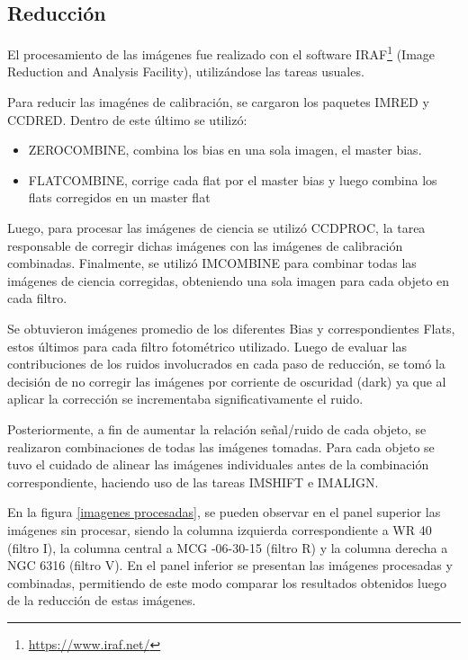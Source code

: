 \documentclass[baaa]{baaa}
\begin{document}
\subsection{Reducción}
El procesamiento de las imágenes fue realizado con el software IRAF\footnote{\url{https://www.iraf.net/}} (Image Reduction and Analysis Facility), utilizándose las tareas usuales.


Para reducir las imagénes de calibración, se cargaron los paquetes IMRED y CCDRED. Dentro de este último se utilizó:

 \begin{itemize}
     \item \textsc{ZEROCOMBINE}, combina los bias en una sola imagen, el master bias.
     \item \textsc{FLATCOMBINE}, corrige cada flat por el master bias y luego combina los flats corregidos en un master flat    
 \end{itemize}

 Luego, para procesar las imágenes de ciencia se utilizó \textsc{CCDPROC}, la tarea responsable de corregir dichas imágenes con las imágenes de calibración combinadas. 
 Finalmente, se utilizó \textsc{IMCOMBINE} para combinar todas las imágenes de ciencia corregidas, obteniendo una sola imagen para cada objeto en cada filtro. 
 
 Se obtuvieron imágenes promedio de los diferentes Bias y correspondientes Flats, estos últimos para cada filtro fotométrico utilizado. Luego de evaluar las contribuciones de los ruidos involucrados en cada paso de reducción, se tomó la decisión de no corregir las imágenes por corriente de oscuridad (dark) ya que al aplicar la corrección se incrementaba significativamente el ruido.

Posteriormente, a fin de aumentar la relación señal/ruido de cada objeto, se realizaron combinaciones de todas las imágenes tomadas. Para cada objeto se tuvo el cuidado de alinear las imágenes individuales antes de la combinación correspondiente, haciendo uso de las tareas \textsc{IMSHIFT} e \textsc{IMALIGN}.

En la figura \ref{imagenes procesadas}, se pueden observar en el panel superior las imágenes sin procesar, siendo la columna izquierda correspondiente a WR 40 (filtro I), la columna central a MCG -06-30-15 (filtro R) y la columna derecha a NGC 6316 (filtro V). En el panel inferior se presentan las imágenes procesadas y combinadas, permitiendo de este modo comparar los resultados obtenidos luego de la reducción de estas imágenes.
\end{document}
